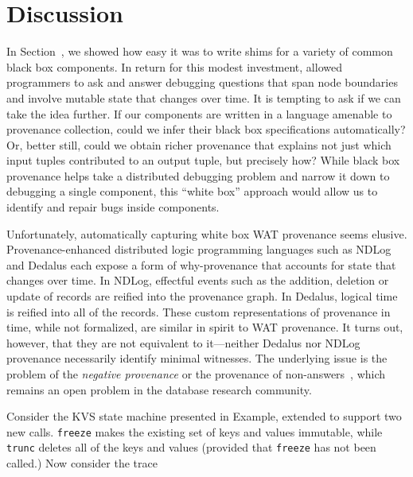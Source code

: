 \section{Discussion}

In Section~, we showed how easy it was to write shims 
for a variety of common black box components.  In return for this modest 
investment, \fluent{}  allowed programmers to ask and answer debugging questions 
that span node boundaries and involve mutable state that changes over time. 
It is tempting to ask if we can take the idea further.  If our components are 
written in a language amenable to provenance collection, could we infer their 
black box specifications automatically?  Or, better still, could we obtain 
richer provenance that explains not just which input tuples contributed to 
an output tuple, but precisely how?  While black box provenance helps take 
a distributed debugging problem and narrow it down to debugging a single 
component, this ``white box'' approach would allow us to identify and repair 
bugs inside components.

Unfortunately, automatically capturing white box WAT provenance seems elusive.  
Provenance-enhanced distributed logic programming languages such as NDLog and 
Dedalus each expose a form of why-provenance that accounts for state that 
changes over time.  In NDLog, effectful events such as the addition, deletion or update of records are reified into the provenance graph.  In Dedalus, logical 
time is reified into all of the records.  These custom representations of 
provenance in time, while not formalized, are similar in spirit to WAT provenance.  
It turns out, however, that they are not equivalent to it---neither Dedalus nor 
NDLog provenance necessarily identify minimal witnesses.  The underlying issue 
is the problem of the \emph{negative provenance} or the provenance of 
non-answers~\cite{chapman2009whynot,huang2008nonanswers}, which remains an open problem in 
the database research community.  

\newcommand{\kvset}{\text{set}}
\newcommand{\kvget}{\text{get}}
\newcommand{\freeze}{\text{freeze}}
\newcommand{\trunc}{\text{trunc}}

Consider the KVS state machine presented in Example, extended to support two new calls.   \texttt{freeze} makes the existing set of keys and values immutable, while \texttt{trunc} deletes all of the keys and values (provided that \texttt{freeze} has not been called.)  Now consider the trace 


